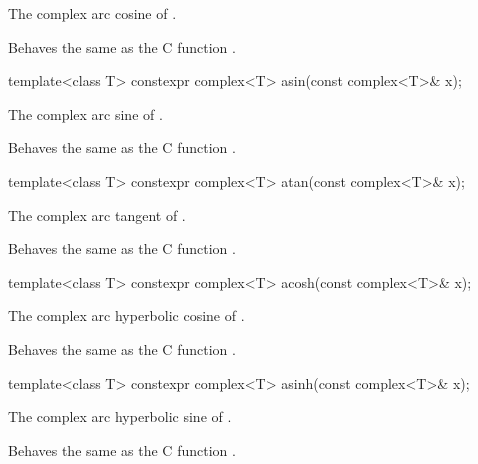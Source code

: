 \begin{itemdescr}
\pnum
\returns
The complex arc cosine of .

\pnum
\remarks
Behaves the same as the C function .
\end{itemdescr}

%
%
\begin{itemdecl}
template<class T> constexpr complex<T> asin(const complex<T>& x);
\end{itemdecl}

\begin{itemdescr}
\pnum
\returns
The complex arc sine of .

\pnum
\remarks
Behaves the same as the C function .
\end{itemdescr}

%
%
\begin{itemdecl}
template<class T> constexpr complex<T> atan(const complex<T>& x);
\end{itemdecl}

\begin{itemdescr}
\pnum
\returns
The complex arc tangent of .

\pnum
\remarks
Behaves the same as the C function .
\end{itemdescr}

%
%
\begin{itemdecl}
template<class T> constexpr complex<T> acosh(const complex<T>& x);
\end{itemdecl}

\begin{itemdescr}
\pnum
\returns
The complex arc hyperbolic cosine of .

\pnum
\remarks
Behaves the same as the C function .
\end{itemdescr}

%
%
\begin{itemdecl}
template<class T> constexpr complex<T> asinh(const complex<T>& x);
\end{itemdecl}

\begin{itemdescr}
\pnum
\returns
The complex arc hyperbolic sine of .

\pnum
\remarks
Behaves the same as the C function .
\end{itemdescr}

